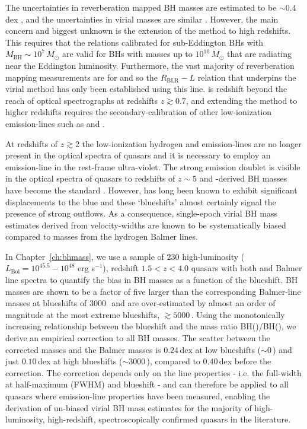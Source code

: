 The uncertainties in reverberation mapped BH masses are estimated to be $\sim 0.4$\,dex \citep[e.g.][]{peterson10}, and the uncertainties in virial masses are similar \citep[e.g.][]{vestergaard06}.
However, the main concern and biggest unknown is the extension of the method to high redshifts. 
This requires that the relations calibrated for sub-Eddington BHs with $M_{\text{BH}}\sim10^7\,M_\odot$ are valid for BHs with masses up to $10^{10}\,M_\odot$ that are radiating near the Eddington luminosity. 
Furthermore, the vast majority of reverberation mapping measurements are for \hb and so the $R_{\text{BLR}}-L$ relation that underpins the virial method has only been established using this line.
\hb is redshift beyond the reach of optical spectrographs at redshifts $z \gtrsim 0.7$, and extending the method to higher redshifts requires the secondary-calibration of other low-ionization emission-lines such as \ha and  \citep[e.g.][]{vestergaard02,mclure02,wu04,kollmeier06,onken08,wang09,rafiee11}.

At redshifts of $z\gtrsim 2$ the low-ionization hydrogen and  emission-lines are no longer present in the optical spectra of quasars and it is necessary to employ an emission-line in the rest-frame ultra-violet.  
The strong  emission doublet is visible in the optical spectra of quasars to redshifts of $z\sim5$ and -derived BH masses have become the standard \citep[e.g.][]{vestergaard06,park13}.
However,  has long been known to exhibit significant displacements to the blue and these `blueshifts' almost certainly signal the presence of strong outflows.
As a consequence, single-epoch virial BH mass estimates derived from  velocity-widths are known to be systematically biased compared to masses from the hydrogen Balmer lines. 

In Chapter~\ref{ch:bhmass}, we use a sample of $230$ high-luminosity ($L_{\text{Bol}} = 10^{45.5}-10^{48}$ erg s$^{-1}$), redshift $1.5 < z < 4.0$ quasars with both  and Balmer line spectra to quantify the bias in  BH masses as a function of the  blueshift. 
 BH masses are shown to be a factor of five larger than the corresponding Balmer-line masses at  blueshifts of $3000$\,\kms\, and are over-estimated by almost an order of magnitude at the most extreme blueshifts, $\gtrsim 5000$\,\kms.
Using the monotonically increasing relationship between the  blueshift and the mass ratio BH()/BH(\hans), we derive an empirical correction to all  BH masses.
The scatter between the corrected  masses and the Balmer masses is $0.24$\,dex at low  blueshifts ($\sim0$\,\kms) and just $0.10$\,dex at high blueshifts ($\sim3000$\,\kms), compared to $0.40$\,dex before the correction. 
The correction depends only on the  line properties - i.e. the full-width at half-maximum (FWHM) and blueshift - and can therefore be applied to all quasars where  emission-line properties have been measured, enabling the derivation of un-biased virial BH mass estimates for the majority of high-luminosity, high-redshift, spectroscopically confirmed quasars in the literature.


